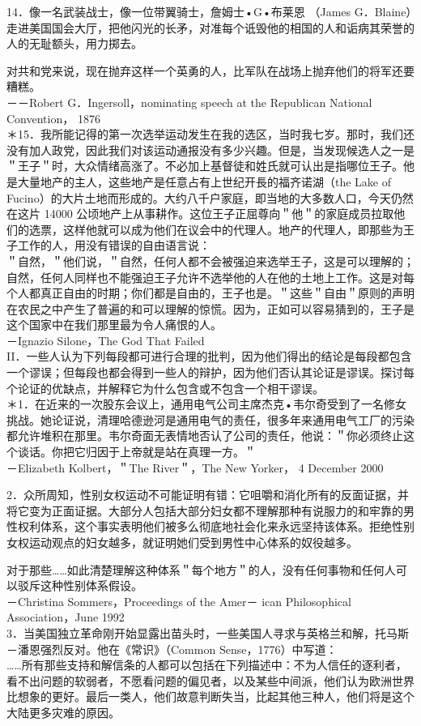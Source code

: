 14．像一名武装战士，像一位带翼骑士，詹姆士•G•布莱恩 （James G．Blaine）走进美国国会大厅，把他闪光的长矛，对准每个诋毁他的相国的人和诟病其荣誉的人的无耻额头，用力掷去。

对共和党来说，现在抛弃这样一个英勇的人，比军队在战场上抛弃他们的将军还要糟糕。\\
－－Robert G．Ingersoll，nominating speech at the Republican National Convention， 1876\\
＊15．我所能记得的第一次选举运动发生在我的选区，当时我七岁。那时，我们还没有加人政党，因此我们对该运动通报没有多少兴趣。但是，当发现候选人之一是＂王子＂时，大众情绪高涨了。不必加上基督徒和姓氏就可认出是指哪位王子。他是大量地产的主人，这些地产是任意占有上世纪开長的福齐诺湖（the Lake of Fucino）的大片土地而形成的。大约八千户家庭，即当地的大多数人口，今天仍然在这片 14000 公顷地产上从事耕作。这位王子正屈尊向＂他＂的家庭成员拉取他们的选票，这样他就可以成为他们在议会中的代理人。地产的代理人，即那些为王子工作的人，用没有错误的自由语言说：\\
＂自然，＂他们说，＂自然，任何人都不会被强迫来选举王子，这是可以理解的；自然，任何人同样也不能强迫王子允许不选举他的人在他的土地上工作。这是对每个人都真正自由的时期；你们都是自由的，王子也是。＂这些＂自由＂原则的声明在农民之中产生了普遍的和可以理解的惊慌。因为，正如可以容易猜到的，王子是这个国家中在我们那里最为令人痛恨的人。\\
－Ignazio Silone，The God That Failed\\
II．一些人认为下列每段都可进行合理的批判，因为他们得出的结论是每段都包含一个谬误；但每段也都会得到一些人的辩护，因为他们否认其论证是谬误。探讨每个论证的优缺点，并解释它为什么包含或不包含一个相干谬误。\\
＊1．在近来的一次股东会议上，通用电气公司主席杰克•韦尔奇受到了一名修女挑战。她论证说，清理哈德逊河是通用电气的责任，很多年来通用电气工厂的污染都允许堆积在那里。韦尔奇面无表情地否认了公司的责任，他说：＂你必须终止这个谈话。你把它归因于上帝就是站在真理一方。＂\\
－Elizabeth Kolbert，＂The River＂，The New Yorker， 4 December 2000

2．众所周知，性别女权运动不可能证明有错：它咀嚼和消化所有的反面证据，并将它变为正面证据。大部分人包括大部分妇女都不理解那种有说服力的和牢靠的男性权利体系，这个事实表明他们被多么彻底地社会化来永远坚持该体系。拒绝性别女权运动观点的妇女越多，就证明她们受到男性中心体系的奴役越多。

对于那些……如此清楚理解这种体系＂每个地方＂的人，没有任何事物和任何人可以驳斥这种性别体系假设。\\
－Christina Sommers，Proceedings of the Amer－ ican Philosophical Association，June 1992\\
3．当美国独立革命刚开始显露出苗头时，一些美国人寻求与英格兰和解，托马斯－潘恩强烈反对。他在《常识》（Common Sense，1776）中写道：\\
……所有那些支持和解信条的人都可以包括在下列描述中：不为人信任的逐利者，看不出问题的软弱者，不愿看问题的偏见者，以及某些中间派，他们认为欧洲世界比想象的更好。最后一类人，他们故意判断失当，比起其他三种人，他们将是这个大陆更多灾难的原因。

